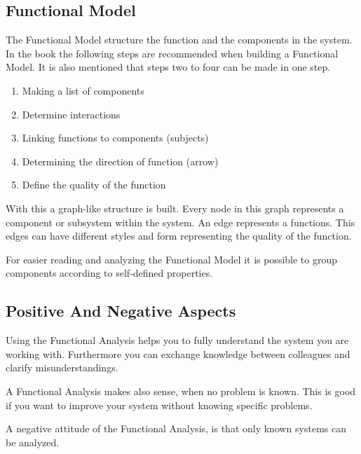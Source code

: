 \subsection{Functional Model}

The Functional Model structure the function and the components in the system.
In the book the following steps are recommended when building a Functional Model. 
It is also mentioned that steps two to four can be made in one step.

\begin{enumerate}[noitemsep]
	\item Making a list of components
	\item Determine interactions
	\item Linking functions to components (subjects)
	\item Determining the direction of function (arrow)
	\item Define the quality of the function
\end{enumerate}

With this a graph-like structure is built. 
Every node in this graph represents a component or subsystem within the system.
An edge represents a functions. 
This edges can have different styles and form representing the quality of the function.

For easier reading and analyzing the Functional Model it is possible to group components according to self-defined properties.

\subsection{Positive And Negative Aspects}

Using the Functional Analysis helps you to fully understand the system you are working with.
Furthermore you can exchange knowledge between colleagues and clarify misunderstandings.

A Functional Analysis makes also sense, when no problem is known.
This is good if you want to improve your system without knowing specific problems.

A negative attitude of the Functional Analysis, is that only known systems can be analyzed.
